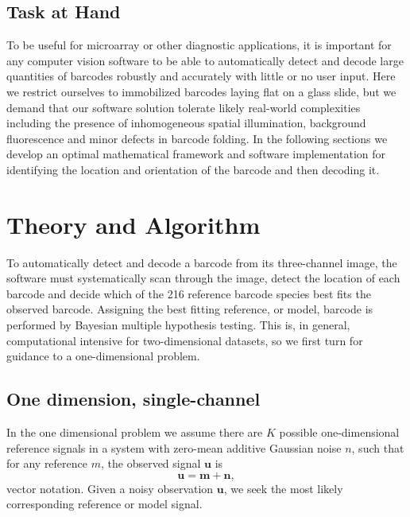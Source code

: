 \subsection{Task at Hand}
To be useful for microarray or other diagnostic applications, it is important for any computer vision software to be able to automatically detect and decode large quantities of barcodes robustly and accurately with little or no user input. 
Here we restrict ourselves to immobilized barcodes laying flat on a glass slide, but we demand that our software solution tolerate likely real-world complexities including the presence of inhomogeneous spatial illumination, background fluorescence and minor defects in barcode folding.  
In the following sections we develop an optimal mathematical framework and software implementation for identifying the location and orientation of the barcode and then decoding it.


\section{Theory and Algorithm}
To automatically detect and decode a barcode from its three-channel image, the software must systematically scan through the image, detect the location of each barcode and decide which of the 216 reference barcode species best fits the observed barcode. Assigning the best fitting reference, or model, barcode is performed by Bayesian multiple hypothesis testing. This is, in general, computational intensive for two-dimensional datasets, so we first turn for guidance to a one-dimensional problem.


\subsection{One dimension, single-channel}
In the one dimensional problem we assume there are $K$ possible one-dimensional reference signals in a system with zero-mean additive Gaussian noise $n$, such that for any reference $m$, the observed signal $\mathbf{u}$ is
\begin{equation}
\mathbf{u}=\mathbf{m} + \mathbf{n},
\end{equation}
vector notation. Given a noisy observation $\mathbf{u}$, we seek the most likely corresponding reference or model signal. 



